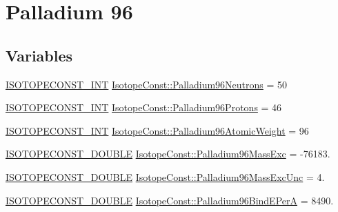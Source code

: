 \hypertarget{group___isotope_const-_palladium-_pd96}{}\section{Palladium 96}
\label{group___isotope_const-_palladium-_pd96}
\subsection*{Variables}
\begin{DoxyCompactItemize}
\item 
\mbox{\hyperlink{group___isotope_const-_macros_ga5f18360b3e99483a35c32d789e62621c}{I\+S\+O\+T\+O\+P\+E\+C\+O\+N\+S\+T\+\_\+\+I\+NT}} \mbox{\hyperlink{group___isotope_const-_palladium-_pd96_ga7de80e5b055ac22ed05e584f1545c01c}{Isotope\+Const\+::\+Palladium96\+Neutrons}} = 50
\item 
\mbox{\hyperlink{group___isotope_const-_macros_ga5f18360b3e99483a35c32d789e62621c}{I\+S\+O\+T\+O\+P\+E\+C\+O\+N\+S\+T\+\_\+\+I\+NT}} \mbox{\hyperlink{group___isotope_const-_palladium-_pd96_ga95a30d90cb9aea2b2d824d07db248383}{Isotope\+Const\+::\+Palladium96\+Protons}} = 46
\item 
\mbox{\hyperlink{group___isotope_const-_macros_ga5f18360b3e99483a35c32d789e62621c}{I\+S\+O\+T\+O\+P\+E\+C\+O\+N\+S\+T\+\_\+\+I\+NT}} \mbox{\hyperlink{group___isotope_const-_palladium-_pd96_ga5d997257cad33d355aafaa709df9259a}{Isotope\+Const\+::\+Palladium96\+Atomic\+Weight}} = 96
\item 
\mbox{\hyperlink{group___isotope_const-_macros_ga8f45a7272ce02c0b4c65c44636ed719a}{I\+S\+O\+T\+O\+P\+E\+C\+O\+N\+S\+T\+\_\+\+D\+O\+U\+B\+LE}} \mbox{\hyperlink{group___isotope_const-_palladium-_pd96_ga61d28a2cd2dbba0916d50683b77970b7}{Isotope\+Const\+::\+Palladium96\+Mass\+Exc}} = -\/76183.
\item 
\mbox{\hyperlink{group___isotope_const-_macros_ga8f45a7272ce02c0b4c65c44636ed719a}{I\+S\+O\+T\+O\+P\+E\+C\+O\+N\+S\+T\+\_\+\+D\+O\+U\+B\+LE}} \mbox{\hyperlink{group___isotope_const-_palladium-_pd96_gad097b15c419b860dab4cd40206b0c7cb}{Isotope\+Const\+::\+Palladium96\+Mass\+Exc\+Unc}} = 4.
\item 
\mbox{\hyperlink{group___isotope_const-_macros_ga8f45a7272ce02c0b4c65c44636ed719a}{I\+S\+O\+T\+O\+P\+E\+C\+O\+N\+S\+T\+\_\+\+D\+O\+U\+B\+LE}} \mbox{\hyperlink{group___isotope_const-_palladium-_pd96_gacff3c65efd54bb065607a1a9e86f5dc9}{Isotope\+Const\+::\+Palladium96\+Bind\+E\+PerA}} = 8490.
\item 

\end{DoxyCompactItemize}
